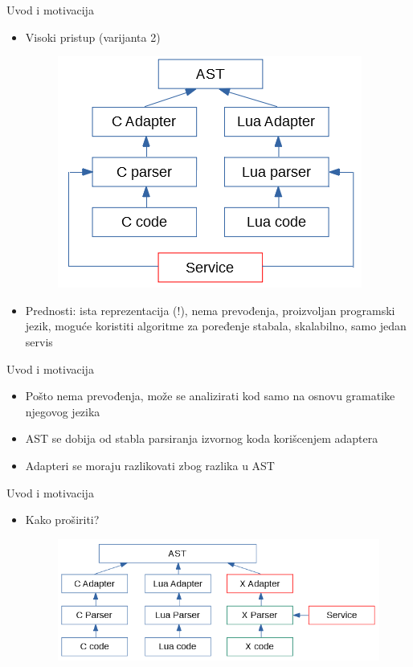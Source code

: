 \documentclass{beamer}
\begin{document}
\begin{frame}{Uvod i motivacija}
    \begin{itemize}
        \item Visoki pristup (varijanta 2)
        \begin{figure}[h!]
            \centering
            \includegraphics[scale=0.8]{images/approach_3.PNG}
        \end{figure}
        \item Prednosti: ista reprezentacija (!), nema prevođenja, proizvoljan programski jezik, mogu\'c{}e koristiti algoritme za poređenje stabala, skalabilno, samo jedan servis
    \end{itemize}
\end{frame}

\begin{frame}{Uvod i motivacija}
    \begin{itemize}
        \item Po\v{s}to nema prevođenja, mo\v{z}e se analizirati kod samo na osnovu gramatike njegovog jezika
        \item AST se dobija od stabla parsiranja izvornog koda kori\v{s}cenjem adaptera
        \item Adapteri se moraju razlikovati zbog razlika u AST
    \end{itemize}
\end{frame}

\begin{frame}{Uvod i motivacija}
    \begin{itemize}
        \item Kako pro\v{s}iriti?
        \begin{figure}[h!]
            \centering
            \includegraphics[scale=0.65]{images/approach_4.PNG}
        \end{figure}
    \end{itemize}
\end{frame}
\end{document}
